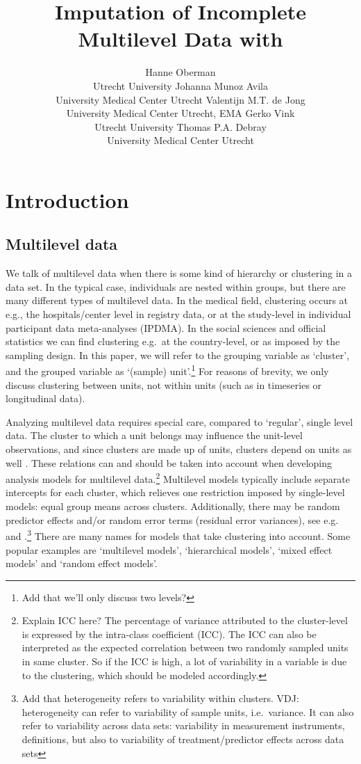 \documentclass[
]{jss}
\author{
Hanne Oberman\\Utrecht University \And Johanna Munoz Avila\\University
Medical Center Utrecht \AND Valentijn M.T. de Jong\\University
Medical Center Utrecht, EMA \And Gerko Vink\\Utrecht University
\AND Thomas P.A. Debray\\University Medical Center Utrecht
}
\title{Imputation of Incomplete Multilevel Data with \pkg{mice}}
\begin{document}
\hypertarget{introduction}{%
\section{Introduction}\label{introduction}}

\hypertarget{multilevel-data}{%
\subsection{Multilevel data}\label{multilevel-data}}

We talk of multilevel data when there is some kind of hierarchy or
clustering in a data set. In the typical case, individuals are nested
within groups, but there are many different types of multilevel data. In
the medical field, clustering occurs at e.g., the hospitals/center level
in registry data, or at the study-level in individual participant data
meta-analyses (IPDMA). In the social sciences and official statistics we
can find clustering e.g.~at the country-level, or as imposed by the
sampling design. In this paper, we will refer to the grouping variable
as `cluster', and the grouped variable as `(sample) unit'.\footnote{Add
  that we'll only discuss two levels?} For reasons of brevity, we only
discuss clustering between units, not within units (such as in
timeseries or longitudinal data).

Analyzing multilevel data requires special care, compared to `regular',
single level data. The cluster to which a unit belongs may influence the
unit-level observations, and since clusters are made up of units,
clusters depend on units as well \citep{hox17}. These relations can and
should be taken into account when developing analysis models for
multilevel data.\footnote{Explain ICC here? The percentage of variance
  attributed to the cluster-level is expressed by the intra-class
  coefficient (ICC). The ICC can also be interpreted as the expected
  correlation between two randomly sampled units in same cluster. So if
  the ICC is high, a lot of variability in a variable is due to the
  clustering, which should be modeled accordingly.} Multilevel models
typically include separate intercepts for each cluster, which relieves
one restriction imposed by single-level models: equal group means across
clusters. Additionally, there may be random predictor effects and/or
random error terms (residual error variances), see e.g. \citet{hox17}
and \citet{jong21}.\footnote{Add that heterogeneity refers to
  variability within clusters. VDJ: heterogeneity can refer to
  variability of sample units, i.e.~variance. It can also refer to
  variability across data sets: variability in measurement instruments,
  definitions, but also to variability of treatment/predictor effects
  across data sets} There are many names for models that take clustering
into account. Some popular examples are `multilevel models',
`hierarchical models', `mixed effect models' and `random effect models'.
\end{document}
